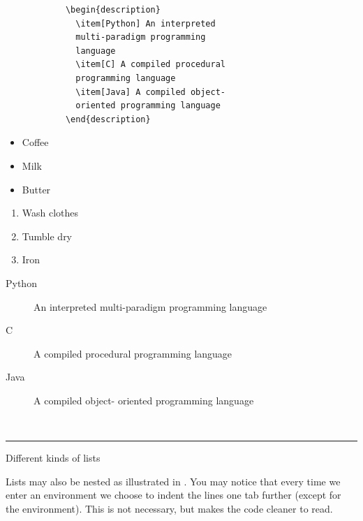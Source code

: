 {\begin{listing}
\begin{minipage}[t]{0.49\textwidth}
\begin{verbatim}
			\begin{description}
			  \item[Python] An interpreted
			  multi-paradigm programming
			  language
			  \item[C] A compiled procedural
			  programming language
			  \item[Java] A compiled object-
			  oriented programming language
			\end{description}	
		\end{verbatim}
	\end{minipage}\hfill\vline\hfill
	\begin{minipage}[t]{0.49\textwidth}
			\begin{itemize}
			  \item Coffee
			  \item Milk
			  \item Butter
			\end{itemize}
			\vspace{0.6em}
			\begin{enumerate}
			  \item Wash clothes
			  \item Tumble dry
			  \item Iron
			\end{enumerate}		
			\vspace{0.6em}
			\begin{description}
			  \item[Python] An interpreted
			  multi-paradigm programming
			  language
			  \item[C] A compiled procedural
			  programming language
			  \item[Java] A compiled object-%
			  oriented programming language
			\end{description}				
	\end{minipage}\\[0.5em]
	\rule{\textwidth}{0.4pt}
	\caption{Different kinds of lists}
	\label{lst:latex:lists}
\end{listing}

Lists may also be nested as illustrated in . You may notice that every time we enter an environment we choose to indent the lines one tab further (except for the  environment). This is not necessary, but makes the code cleaner to read.

}
